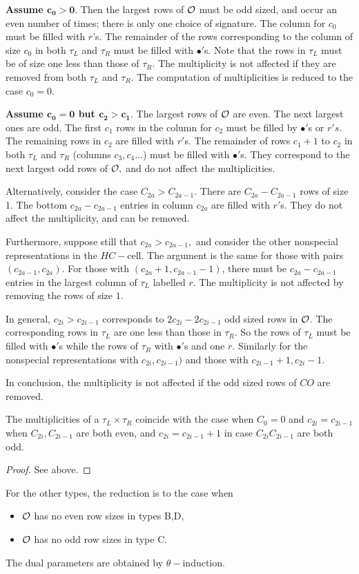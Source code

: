 \documentclass[11pt ,reqno]{amsart}
\begin{document}
\textbf{Assume $\mathbf{c_0>0}$}. Then the largest rows of $\mathcal O$ must
be odd sized, and occur 
an even number of times; there is only one choice of signature. The column for
$c_0$ must be filled with $r$'s. The remainder of the rows
corresponding to the column of size $c_0$  in both $\tau_L$ and $\tau_R$ must
be filled with $\bullet'$s. Note that the rows in $\tau_L$ must be of size
one less than those of $\tau_R.$ The multiplicity is not affected if
they are removed from both $\tau_L$ and $\tau_R.$ The computation of
multiplicities is reduced to the case $c_0=0.$ 


\textbf{Assume $\mathbf{c_0=0}$ but $\mathbf{c_2>c_1}$}. The largest rows of $\mathcal O$ are even. The
next largest ones are odd. 
The first $c_1$ rows in the column for
$c_2$ must be filled by $\bullet'$s or $r's$. The remaining rows in
$c_2$ are filled with $r'$s. The remainder of rows $c_1+1$ to $c_2$ in both $\tau_L$ and
$\tau_R$ (columns $c_3, c_4\dots$) must be filled with
$\bullet'$s. They  correspond to the next largest odd rows of $\mathcal O,$ and
do not affect the multiplicities.

Alternatively, consider the case $C_{2a}>C_{2a-1}.$ 
There are $C_{2a}-C_{2a-1}$ rows of size 1. 
The bottom $c_{2a}-c_{2a-1}$ entries in column $c_{2a}$ are filled with $r'$s. 
They do not affect the multiplicity, and can be removed.

Furthermore, suppose still that $c_{2a}>c_{2a-1},$ and consider the other
nonspecial representations in the $HC-$cell. The argument is the same
for those with pairs $(c_{2a-1},c_{2a}).$  For those with
$(c_{2a}+1,c_{2a-1}-1)$, there must be $c_{2a}-c_{2a-1}$ entries
in the largest column of $\tau_L$ labelled $r$. The multiplicity is
not affected by removing the rows of size $1$. 

In general, $c_{2i}>c_{2i-1}$ corresponds to $2c_{2i}-2c_{2i-1}$ odd
sized rows in $\mathcal O$. The corresponding rows in $\tau_L$ are one less
than those in $\tau_R.$ So the rows of $\tau_L$ must be filled with
$\bullet'$s while the rows of $\tau_R$ with $\bullet'$s and one $r.$
Similarly for the nonspecial representations with $c_{2i},c_{2i-1})$
and those with $c_{2i-1}+1,c_{2i}-1.$ 

In conclusion,  the multiplicity is not affected if the odd sized rows
of $CO$ are removed. 
\begin{theorem}[{Type C}]\label{t:1}
The multiplicities of a $\tau_L\times\tau_R$ coincide with the case
when $C_0=0$ and $c_{2i}=c_{2i-1}$ when $C_{2i},C_{2i-1}$ are both even, and
$c_{2i}=c_{2i-1}+1$ in case $C_{2i}C_{2i-1}$ are both odd. 

\end{theorem}
\begin{proof}
See above. 
\end{proof}
For the other types, the reduction is to the case when 
\begin{itemize}
\item $\mathcal O$ has no even row sizes in types B,D,
\item $\mathcal O$ has no odd row sizes in type C.
\end{itemize}
\begin{remark*}
The dual parameters are obtained by $\theta-$induction.  
\end{remark*}
\end{document}
